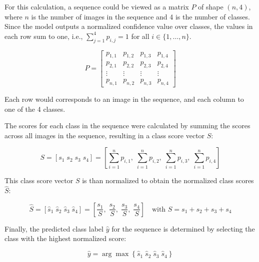     For this calculation, a sequence could be viewed as a matrix \( P \) of shape \((n, 4)\), where \(n\) is the number of images in the sequence and 4 is the number of classes.
    Since the model outputs a normalized confidence value over classes, the values in each row sum to one, i.e., \( \sum_{j=1}^{4} p_{i,j} = 1 \) for all \( i \in \{1, \ldots, n\} \).

    \begin{equation}
    P = 
    \begin{bmatrix}
    p_{1,1} & p_{1,2} & p_{1,3} & p_{1,4} \\
    p_{2,1} & p_{2,2} & p_{2,3} & p_{2,4} \\
    \vdots  & \vdots  & \vdots  & \vdots  \\
    p_{n,1} & p_{n,2} & p_{n,3} & p_{n,4}
    \end{bmatrix}
    \label{eq:sequence_matrix}
    \end{equation}

    Each row would corresponds to an image in the sequence, and each column to one of the 4 classes.

    The scores for each class in the sequence were calculated by summing the scores across all images in the sequence, resulting in a class score vector \( S \):

    \begin{equation}
    S = [s_1\; s_2\; s_3\; s_4] = \left[ \sum_{i=1}^n p_{i,1},\; \sum_{i=1}^n p_{i,2},\; \sum_{i=1}^n p_{i,3},\; \sum_{i=1}^n p_{i,4} \right]
    \label{eq:class_score_vector}
    \end{equation}

    This class score vector \( S \) is than normalized to obtain the normalized class scores \( \hat{S} \):

    \begin{equation}
    \hat{S} = [\hat{s}_1\; \hat{s}_2\; \hat{s}_3\; \hat{s}_4] = \left[ \frac{s_1}{S},\; \frac{s_2}{S},\; \frac{s_3}{S},\; \frac{s_4}{S} \right]
    \quad \text{with } S = s_1 + s_2 + s_3 + s_4
    \label{eq:normalized_class_scores}
    \end{equation}


    Finally, the predicted class label \( \hat{y} \) for the sequence is determined by selecting the class with the highest normalized score:

    \begin{equation}
    \hat{y} = \arg\max \left\{\hat{s}_1\; \hat{s}_2\; \hat{s}_3\; \hat{s}_4\right\}
    \label{eq:predicted_sequence_label}
    \end{equation}

